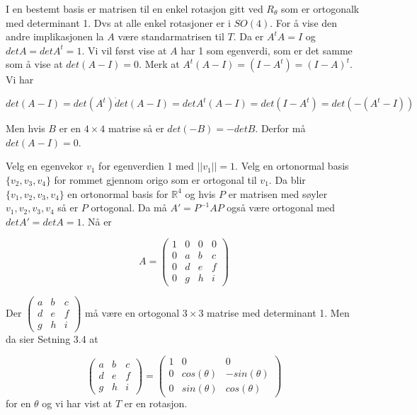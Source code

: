 \documentclass[a4paper,10pt,english]{article}
\begin{document}
    I en bestemt basis er matrisen til en enkel rotasjon gitt ved $R_{\theta}$ som er ortogonalk med determinant 1. Dvs at alle enkel rotasjoner er i $SO(4)$.
    For å vise den andre implikasjonen la $A$ være standarmatrisen til $T$. Da er $A^{t}A = I$ og $det A = det A^{t} = 1$. Vi vil først vise at $A$ har 1 som egenverdi, som er det samme som å vise 
    at $det(A - I) = 0$. Merk at $A^{t}(A - I) = (I - A^{t}) = (I - A)^{t}$. Vi har 

    $$ det(A- I) = det(A^{t}) \dot det(A - I) = det A^{t}(A - I) = det(I- A^{t}) = det(-(A^{t} - I)) $$

    Men hvis $B$ er en $4 \times 4$ matrise så er $det(-B) = -det B$. Derfor må $det(A - I) = 0$.
    
    Velg en egenvekor $v_{1}$ for egenverdien 1 med $||v_{1}|| = 1$. Velg en ortonormal basis $\{v_{2}, v_{3}, v_{4}\}$ for rommet gjennom origo som er ortogonal til $v_{1}$.
    Da blir $\{v_{1}, v_{2}, v_{3}, v_{4}\}$ en ortonormal basis for $\mathbb{R}^{4}$ og hvis $P$ er matrisen med søyler $v_{1}, v_{2}, v_{3}, v_{4}$ så er $P$ ortogonal.
    Da må $A' = P^{-1}AP$ også være ortogonal med $det A' = det A = 1$.
    Nå er 

    $$
    A = \left(
    \begin{matrix}
        1 & 0 & 0 & 0 \\
        0 & a & b & c \\
        0 & d & e & f \\
        0 & g & h & i
    \end{matrix}
    \right)
    $$

Der $\left( \begin{matrix} a & b & c \\ d & e & f \\ g & h & i \end{matrix} \right)$ må være en ortogonal $3 \times 3$ matrise med determinant 1. Men da sier Setning 3.4 at

$$
\left(
    \begin{matrix}
        a & b & c \\
        d & e & f \\
        g & h & i
    \end{matrix}
\right)
=
\left(
    \begin{matrix}
        1 & 0 & 0 \\
        0 & cos(\theta) & -sin(\theta) \\
        0 & sin(\theta) &  cos(\theta)
    \end{matrix}
\right)
$$
for en $\theta$ og vi har vist at $T$ er en rotasjon.
\end{document}
